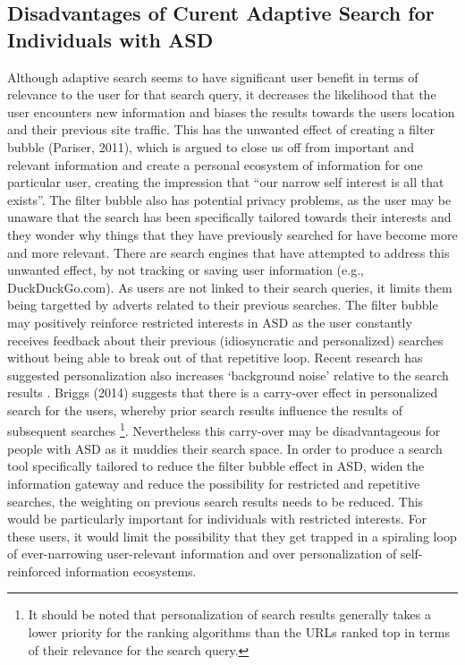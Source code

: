 \documentclass[10pt]{article}
\begin{document}
\subsection{Disadvantages of Curent Adaptive Search for Individuals with ASD}
Although adaptive search seems to have significant user benefit in terms of relevance to the user for that search query, it decreases the likelihood that the user encounters new information and biases the results towards the users location and their previous site traffic.  This has the unwanted effect of creating a filter bubble (Pariser, 2011), which is argued to close us off from important and relevant information and create a personal ecosystem of information for one particular user, creating the impression that “our narrow self interest is all that exists”. The filter bubble also has potential privacy problems, as the user may be unaware that the search has been specifically tailored towards their interests and they wonder why things that they have previously searched for have become more and more relevant. There are search engines that have attempted to address this unwanted effect, by not tracking or saving user information (e.g., DuckDuckGo.com). As users are not linked to their search queries, it limits them being targetted by adverts related to their previous searches. The filter bubble may positively reinforce restricted interests in ASD as the user constantly receives feedback about their previous (idiosyncratic and personalized) searches without being able to break out of that repetitive loop. 
Recent research has suggested personalization also increases ‘background noise’ relative to the search results \cite{briggs}. Briggs (2014) suggests that there is a carry-over effect in personalized search for the users, whereby prior search results influence the results of subsequent searches \footnote{It should be noted that personalization of search results generally takes a lower priority for the ranking algorithms than the URLs ranked top in terms of their relevance for the search query.}.  Nevertheless this carry-over may be disadvantageous for people with ASD as it muddies their search space.
In order to produce a search tool specifically tailored to reduce the filter bubble effect in ASD, widen the information gateway and reduce the possibility for restricted and repetitive searches, the weighting on previous search results needs to be reduced. This would be particularly important for individuals with restricted interests. For these users, it would limit the possibility that they get trapped in a spiraling loop of ever-narrowing user-relevant information and over personalization of self-reinforced information ecosystems.
\end{document}
